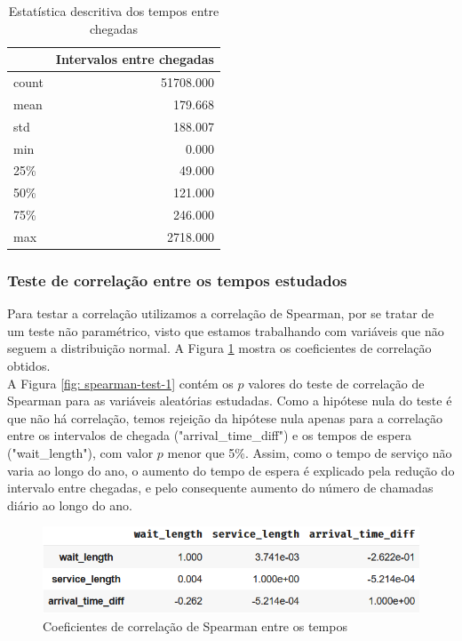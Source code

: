 \begin{table}[H]
    \centering
    \begin{tabular}{lr}
            \toprule
            {} &  Intervalos entre chegadas \\
            \midrule
            count &   51708.000  \\
            mean  &      179.668  \\
            std   &      188.007  \\
            min   &       0.000  \\
            25\%   &       49.000  \\
            50\%   &       121.000  \\
            75\%   &       246.000  \\
            max   &     2718.000  \\
        \bottomrule
        \end{tabular}
    \caption{Estatística descritiva dos tempos entre chegadas}
    \label{tab: descricao-arrivals}
\end{table}

\subsubsection{Teste de correlação entre os tempos estudados}
Para testar a correlação utilizamos a correlação de Spearman, por se tratar de um teste não paramétrico, visto que estamos trabalhando com variáveis que não seguem a distribuição normal. A Figura \ref*{fig: corr-spearman-1} mostra os coeficientes de correlação obtidos.\\
A Figura \ref*{fig: spearman-test-1} contém os $p$ valores do teste de correlação de Spearman para as variáveis aleatórias estudadas. Como a hipótese nula do teste é que não há correlação, temos rejeição da hipótese nula apenas para a correlação entre os intervalos de chegada ("arrival\_time\_diff") e os tempos de espera ("wait\_length"), com valor $p$ menor que 5\%. Assim, como o tempo de serviço não varia ao longo do ano, o aumento do tempo de espera é explicado pela redução do intervalo entre chegadas, e pelo consequente aumento do número de chamadas diário ao longo do ano.

\begin{figure}[H]
    \includegraphics{analise-de-dados/anual/corr-spearman.png}
    \caption{Coeficientes de correlação de Spearman entre os tempos}
    \label{fig: corr-spearman-1}
\end{figure}

